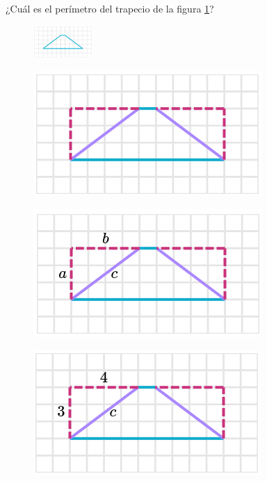 
¿Cuál es el perímetro del trapecio de la figura \ref{fig:peri_trap_03}?

\begin{figure}[H]
    \centering
    \includegraphics[width=0.2\textwidth]{../images/peri_trap_03.png}
    \caption{}
    \label{fig:peri_trap_03}
\end{figure}
\begin{solutionbox}{16cm}
    \begin{minipage}{0.3\textwidth}
        \begin{figure}[H]
            \centering
            \includegraphics[width=0.6\linewidth]{../images/peri_trap_03a.png}
            \caption{}
            \label{fig:peri_trap_03a}
        \end{figure}
        \begin{figure}[H]
            \centering
            \includegraphics[width=0.6\linewidth]{../images/peri_trap_03b.png}
            \caption{}
            \label{fig:peri_trap_03b}
        \end{figure}
        \begin{figure}[H]
            \centering
            \includegraphics[width=0.6\linewidth]{../images/peri_trap_03c.png}

\end{figure}
\end{minipage}
\end{solutionbox}

